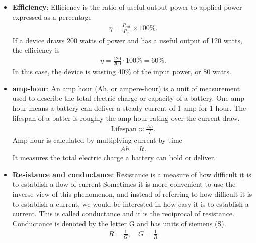 \documentclass{report}
\begin{document}
\begin{itemize}
            So,
            \begin{align*}
                P = \frac{VQ}{t} = IV
            .\end{align*}
            We call $P = VI$ the \textbf{power law}.
        \item \textbf{Efficiency}: Efficiency is the ratio of useful output power to applied power expressed as a percentage
            \begin{align*}
                \eta = \frac{P_{\text{out}}}{P_{\text{in}}} \times 100\%
            .\end{align*}
            If a device draws 200 watts of power and has a useful output of 120 watts, the efficiency is
            \begin{align*}
                \eta = \frac{120}{200} \cdot 100\% = 60\%
            .\end{align*}
            In this case, the device is wasting 40\% of the input power, or 80 watts.
        \item \textbf{amp-hour}: An amp hour (Ah, or ampere-hour) is a unit of measurement used to describe the total electric charge or capacity of a battery.
            \bigbreak \noindent 
            One amp hour means a battery can deliver a steady current of 1 amp for 1 hour.
            \bigbreak \noindent 
            The lifespan of a batter is roughly the amp-hour rating over the current draw.
            \begin{align*}
                \text{Lifespan} \approx \frac{Ah}{I}
            .\end{align*}
            Amp-hour is calculated by multiplying current by time
            \begin{align*}
                Ah = It
            .\end{align*}
            It measures the total electric charge a battery can hold or deliver.
        \item \textbf{Resistance and conductance}:  Resistance is a measure of how difficult it is to establish a flow of current
            \bigbreak \noindent 
            Sometimes it is more convenient to use the inverse view of this phenomenon, and instead of referring to how difficult it is to establish a current, we would be interested in how easy it is to establish a current. This is called conductance and it is the reciprocal of resistance. Conductance is denoted by the letter G and has units of siemens (S).
            \begin{align*}
                R = \frac{1}{G}, \quad G = \frac{1}{R}

\end{align*}
\end{itemize}
\end{document}
